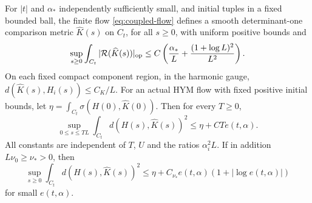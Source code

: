 \begin{theorem}\label{thm:coupled-tracking}
For $|t|$ and $\alpha_*$ independently
sufficiently small, and initial tuples in a fixed bounded ball,
the finite flow \eqref{eq:coupled-flow}
defines a smooth determinant-one comparison
metric $\widehat K(s)$ on $C_t$, for all
$s\ge0$, with uniform positive bounds and
\begin{equation}\label{eq:coupled-residual}
 \sup_{s\ge0}\int_{C_t}|\mathcal R(\widehat K(s))|_{\mathrm{op}}
 \le C\left(\frac{\alpha_*}{L}
                       +\frac{(1+\log L)^2}{L^2}\right).
\end{equation}
On each fixed compact component region,
in the harmonic gauge,
$d(\widehat K(s),H_i(s))\le C_K/L$.
For an actual HYM flow with fixed positive
initial bounds, let
$\eta=\int_{C_t}\sigma(H(0),\widehat K(0))$.
Then for every $T\ge0$,
\begin{equation}\label{eq:coupled-tracking}
 \sup_{0\le s\le TL}\int_{C_t}d(H(s),\widehat K(s))^2
                       \le\eta+CTe(t,\alpha).
\end{equation}
All constants are independent of $T$, $U$
and the ratios $\alpha_i^2L$.
If in addition $L\nu_0\ge\nu_*>0$, then
\begin{equation}\label{eq:coupled-alltime}
 \sup_{s\ge0}\int_{C_t}d(H(s),\widehat K(s))^2
 \le\eta+C_{\nu_*}e(t,\alpha)(1+|\log e(t,\alpha)|)
\end{equation}
for small $e(t,\alpha)$.
\end{theorem}
